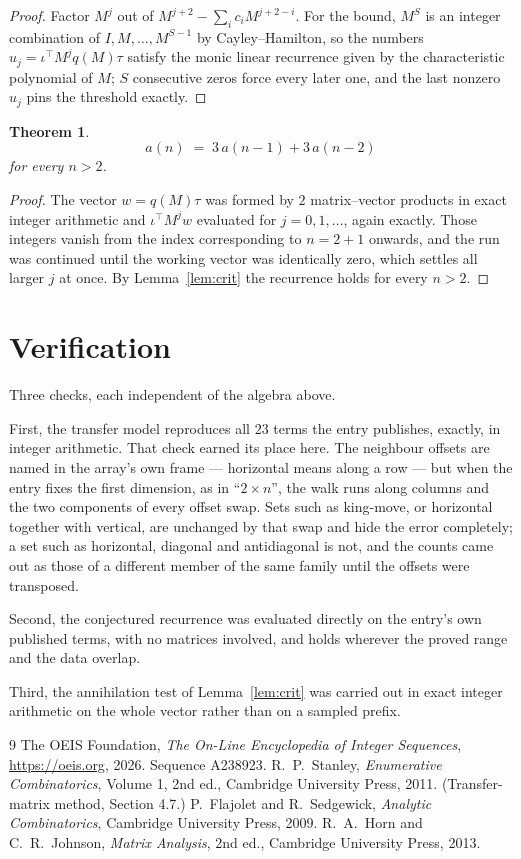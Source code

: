 \documentclass[11pt,a4paper]{article}
\theoremstyle{plain}
\newtheorem{theorem}{Theorem}
\theoremstyle{definition}
\begin{document}
\begin{proof}
Factor $M^{j}$ out of $M^{j+2}-\sum_ic_iM^{j+2-i}$. For the bound, $M^{S}$
is an integer combination of $I,M,\dots,M^{S-1}$ by Cayley--Hamilton, so the numbers
$u_j=\iota^{\!\top}M^{j}q(M)\tau$ satisfy the monic linear recurrence given by the
characteristic polynomial of $M$; $S$ consecutive zeros force every later one, and the last
nonzero $u_j$ pins the threshold exactly.
\end{proof}

\begin{theorem}
\[
a(n)\;=\;3\,a(n-1) + 3\,a(n-2)
\]
for every $n>2$.
\end{theorem}

\begin{proof}
The vector $w=q(M)\tau$ was formed by $2$ matrix--vector products in exact integer
arithmetic and $\iota^{\!\top}M^{j}w$ evaluated for $j=0,1,\dots$, again exactly. Those
integers vanish from the index corresponding to $n=2+1$ onwards, and the run was
continued until the working vector was identically zero, which settles all larger $j$ at once.
By Lemma~\ref{lem:crit} the recurrence holds for every $n>2$.
\end{proof}

\section{Verification}

Three checks, each independent of the algebra above.

First, the transfer model reproduces all $23$ terms the entry publishes, exactly, in
integer arithmetic. That check earned its place here. The neighbour offsets are named in the
array's own frame --- horizontal means along a row --- but when the entry fixes the first
dimension, as in ``$2\times n$'', the walk runs along columns and the two components of every
offset swap. Sets such as king-move, or horizontal together with vertical, are unchanged by
that swap and hide the error completely; a set such as horizontal, diagonal and antidiagonal
is not, and the counts came out as those of a different member of the same family until the
offsets were transposed.

Second, the conjectured recurrence was evaluated directly on the entry's own published terms,
with no matrices involved, and holds wherever the proved range and the data overlap.

Third, the annihilation test of Lemma~\ref{lem:crit} was carried out in exact integer
arithmetic on the whole vector rather than on a sampled prefix.

\begin{thebibliography}{9}
 The OEIS Foundation, \emph{The On-Line Encyclopedia of Integer
Sequences}, \url{https://oeis.org}, 2026. Sequence A238923.
 R.~P.~Stanley, \emph{Enumerative Combinatorics}, Volume 1, 2nd ed.,
Cambridge University Press, 2011. (Transfer-matrix method, Section 4.7.)
 P.~Flajolet and R.~Sedgewick, \emph{Analytic Combinatorics}, Cambridge
University Press, 2009.
 R.~A.~Horn and C.~R.~Johnson, \emph{Matrix Analysis}, 2nd ed., Cambridge
University Press, 2013.
\end{thebibliography}
\end{document}
